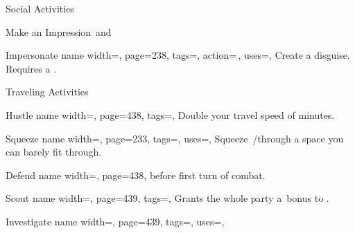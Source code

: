 \begin{PageFront}
\begin{Tables}{\frontTableHeight}
\begin{Table}{Social Activities}
\begin{entry}{Make an Impression}
                \quad\Auditory\,and \Linguistic
            \end{entry}
            \begin{entry}{Impersonate}{%
                name width=\activityLength,%
                page=238,
                tags=\Concentrate\Manipulate,
                action=\,,
                uses={\Deception[tags={S}]},
            }
                Create a disguise. Requires a . \hfill
            \end{entry}
        \end{Table}
        \TableSpace
        \begin{Table}{Traveling Activities}
            \begin{entry}{Hustle}{%
                name width=\activityLength,%
                page=438,
                tags=\Move,
            }
                Double your travel speed of  minutes.\quad
            \end{entry}
            \begin{entry}{Squeeze}{%
                name width=\activityLength,%
                page=233,
                tags=\Move,
                uses={\Acrobatics[tags=T]},
            }
                Squeeze \,\Feet/\Min through a space you can barely fit through. \hfill
            \end{entry}
            \begin{entry}{Defend}{%
                name width=\activityLength,%
                page=438,
            }
                 before first turn of combat.\hfill
            \end{entry}
            \begin{entry}{Scout}{%
                name width=\activityLength,%
                page=439,
                tags=\Concentrate,
            }
                Grants the whole party a \,\Cirm bonus to .
            \end{entry}
            \breakLine
            \begin{entry}{Investigate}{%
                name width=\activityLength,%
                page=439,
                tags=\Concentrate,
                uses={\VariousKnowledge[tags=S]},
            }

\end{entry}
\end{Table}
\end{Tables}
\end{PageFront}
